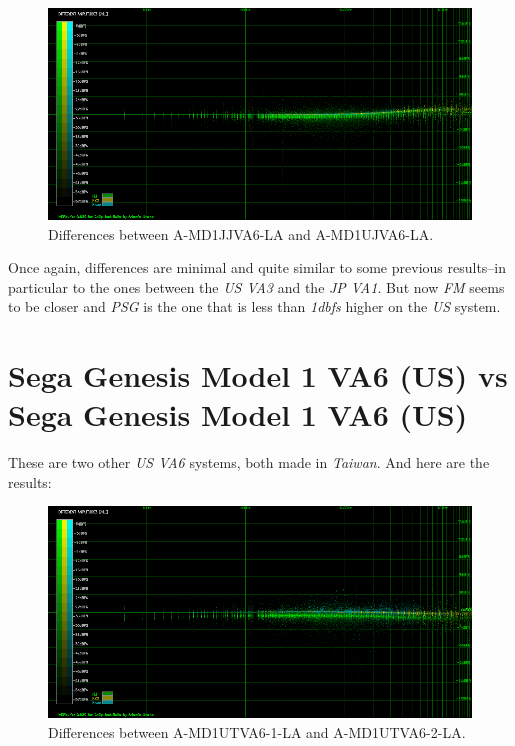 \documentclass[10pt,a4paper]{report}
\newcommand{\db}[1]{\textit{#1\acrshort{dbfs}}}
\begin{document}
\begin{figure}[H]
	\centering
	\includegraphics[width=1.0\linewidth]{images/results/3-A-MD1JJVA6-LA_vs_A-MD1UJVA6-LA.png}
	\caption[A-MD1JJVA6-LA vs A-MD1UJVA6-LA]{Differences between A-MD1JJVA6-LA and A-MD1UJVA6-LA.}
	\label{fig:A-MD1JJVA6-LA_vs_A-MD1UJVA6-LA}
\end{figure}

Once again, differences are minimal and quite similar to some previous results--in particular to the ones between the \textit{US VA3} and the \textit{JP VA1}. But now \textit{FM} seems to be closer and \textit{PSG} is the one that is less than \db{1} higher on the \textit{US} system.

\section{Sega Genesis Model 1 VA6 (US) vs\\ Sega Genesis Model 1 VA6 (US)}

These are two other \textit{US VA6} systems, both made in \textit{Taiwan}. And here are the results:

\begin{figure}[H]
	\centering
	\includegraphics[width=1.0\linewidth]{images/results/4-A-MD1UTVA6-1-LA_vs_A-MD1UTVA6-2-LA.png}
	\caption[A-MD1UTVA6-1-LA vs A-MD1UTVA6-2-LA]{Differences between A-MD1UTVA6-1-LA and A-MD1UTVA6-2-LA.}
	\label{fig:A-MD1UTVA6-1-LA_vs_A-MD1UTVA6-2-LA}
\end{figure}
\end{document}
